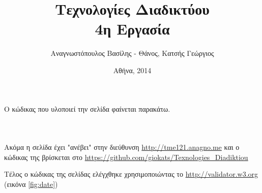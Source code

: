 \documentclass{assignment}
\title{Τεχνολογίες Διαδικτύου \\ 4η Εργασία}
\date{Αθήνα, 2014}
\author{Αναγνωστόπουλος Βασίλης - Θάνος, Κατσής Γεώργιος}
\begin{document}
\maketitle

\setcounter{page}{1} 

\pagestyle{plain}
\tableofcontents
\newpage


\pagestyle{fancy}
\setcounter{page}{1} 

\begin{Assignment}%

Ο κώδικας που υλοποιεί την σελίδα φαίνεται παρακάτω.

\inputminted[linenos,tabsize=2]{html}{../../index.html}

\inputminted[linenos,tabsize=2]{css}{../../theme.css}

\inputminted[linenos,tabsize=2]{js}{../../javascript.js}

Ακόμα η σελίδα έχει "ανέβει" στην διεύθυνση \url{http://tme121.anagno.me}
και ο κώδικας της βρίσκεται στο \url{https://github.com/giokats/Texnologies_Diadiktiou}
\end{Assignment}

Τέλος ο κώδικας της σελίδας ελέγχθηκε χρησιμοποιώντας το \url{http://validator.w3.org} (εικόνα 
\ref{fig:date})
\end{document}
